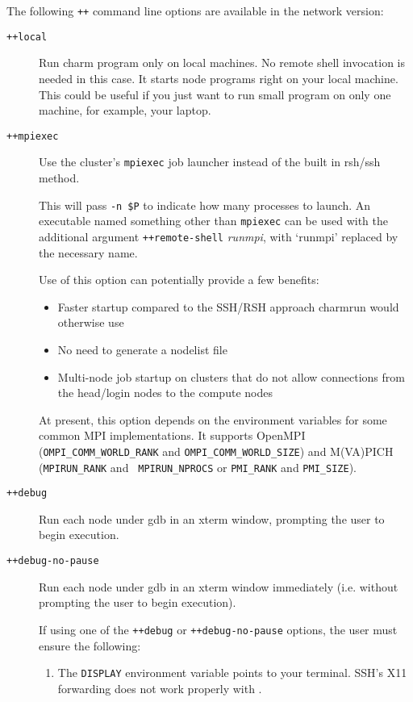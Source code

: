 The following {\tt ++} command line options are available in
the network version:
\begin{description}

\item[{\tt ++local}] Run charm program only on local machines. No 
 remote shell invocation is needed in this case. It starts node programs 
 right on your local machine. This could be useful if you just want to 
 run small program on only one machine, for example, your laptop.


\item[{\tt ++mpiexec}]
\label{mpiexec}
Use the cluster's {\tt mpiexec} job launcher instead of the built in rsh/ssh
method.

This will pass {\tt -n \$P} to indicate how many processes to
launch. An executable named something other than {\tt mpiexec} can be
used with the additional argument {\tt ++remote-shell} {\it runmpi},
with `runmpi' replaced by the necessary name.

Use of this option can potentially provide a few benefits:

\begin{itemize}
\item Faster startup compared to the SSH/RSH approach charmrun would
  otherwise use
\item No need to generate a nodelist file
\item Multi-node job startup on clusters that do not allow connections
  from the head/login nodes to the compute nodes
\end{itemize}

At present, this option depends on the environment variables for some
common MPI implementations. It supports OpenMPI ({\tt OMPI\_COMM\_WORLD\_RANK} and
{\tt OMPI\_COMM\_WORLD\_SIZE}) and M(VA)PICH ({\tt MPIRUN\_RANK} and {\tt
  MPIRUN\_NPROCS} or {\tt PMI\_RANK} and {\tt PMI\_SIZE}).

\item[{\tt ++debug}] Run each node under gdb in an xterm window, prompting
the user to begin execution.

\item[{\tt ++debug-no-pause}] Run each node under gdb in an xterm window
immediately (i.e. without prompting the user to begin execution).

If using one of the {\tt ++debug} or {\tt ++debug-no-pause} options,
the user must ensure the following:
\begin{enumerate}

\item The {\tt DISPLAY} environment variable points to your terminal.
SSH's X11 forwarding does not work properly with \charmpp{}.


\end{enumerate}
\end{description}
